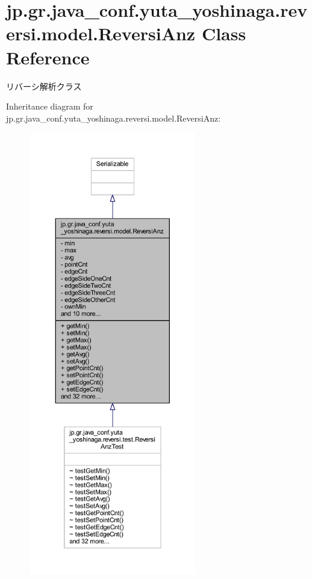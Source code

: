 \hypertarget{classjp_1_1gr_1_1java__conf_1_1yuta__yoshinaga_1_1reversi_1_1model_1_1_reversi_anz}{}\section{jp.\+gr.\+java\+\_\+conf.\+yuta\+\_\+yoshinaga.\+reversi.\+model.\+Reversi\+Anz Class Reference}
\label{classjp_1_1gr_1_1java__conf_1_1yuta__yoshinaga_1_1reversi_1_1model_1_1_reversi_anz}


リバーシ解析クラス  




Inheritance diagram for jp.\+gr.\+java\+\_\+conf.\+yuta\+\_\+yoshinaga.\+reversi.\+model.\+Reversi\+Anz\+:
\nopagebreak
\begin{figure}[H]
\begin{center}
\leavevmode
\includegraphics[height=550pt]{classjp_1_1gr_1_1java__conf_1_1yuta__yoshinaga_1_1reversi_1_1model_1_1_reversi_anz__inherit__graph}
\end{center}
\end{figure}


